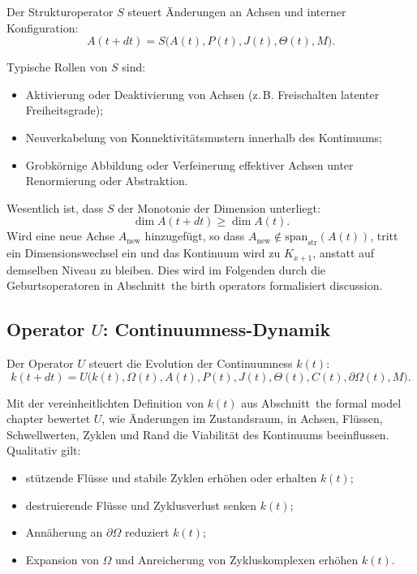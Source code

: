 Der Strukturoperator \(S\) steuert Änderungen an Achsen und interner
Konfiguration:
\[
  A(t+dt) = S\big(A(t), P(t), J(t), \Theta(t), M\big).
\]

Typische Rollen von \(S\) sind:
\begin{itemize}
  \item Aktivierung oder Deaktivierung von Achsen (z.\,B. Freischalten latenter
        Freiheitsgrade);
  \item Neuverkabelung von Konnektivitätsmustern innerhalb des Kontinuums;
  \item Grobkörnige Abbildung oder Verfeinerung effektiver Achsen unter
        Renormierung oder Abstraktion.
\end{itemize}

Wesentlich ist, dass \(S\) der Monotonie der Dimension unterliegt:
\[
  \dim A(t+dt) \ge \dim A(t).
\]
Wird eine neue Achse \(A_{\mathrm{new}}\) hinzugefügt, so dass
\(A_{\mathrm{new}} \notin \mathrm{span}_{\mathrm{str}}(A(t))\), tritt ein
Dimensionswechsel ein und das Kontinuum wird zu \(K_{x+1}\), anstatt auf demselben
Niveau zu bleiben. Dies wird im Folgenden durch die Geburtsoperatoren in
Abschnitt~the birth operators formalisiert discussion.

\subsection{Operator \texorpdfstring{\texorpdfstring{$U$}{U}}{U}: Continuumness-Dynamik}

Der Operator \(U\) steuert die Evolution der Continuumness \(k(t)\):
\[
  k(t+dt) =
  U\big(k(t), \Omega(t), A(t), P(t), J(t),
        \Theta(t), C(t), \partial\Omega(t), M\big).
\]

Mit der vereinheitlichten Definition von \(k(t)\) aus Abschnitt~the formal model chapter
bewertet \(U\), wie Änderungen im Zustandsraum, in Achsen, Flüssen,
Schwellwerten, Zyklen und Rand die Viabilität des Kontinuums beeinflussen.
Qualitativ gilt:
\begin{itemize}
  \item stützende Flüsse und stabile Zyklen erhöhen oder erhalten \(k(t)\);
  \item destruierende Flüsse und Zyklusverlust senken \(k(t)\);
  \item Annäherung an \(\partial\Omega\) reduziert \(k(t)\);
  \item Expansion von \(\Omega\) und Anreicherung von Zykluskomplexen erhöhen
        \(k(t)\).
\end{itemize}

